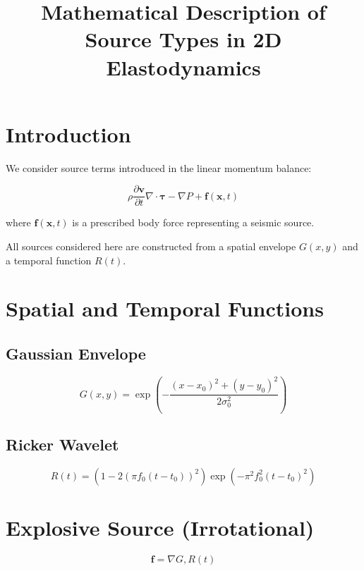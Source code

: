 \documentclass[11pt]{article}
\title{Mathematical Description of Source Types in 2D Elastodynamics}
\author{}
\date{}
\begin{document}
\maketitle

\section{Introduction}

We consider source terms introduced in the linear momentum balance:

\begin{equation}
\rho \frac{\partial \bm{v}}{\partial t}
\nabla \cdot \bm{\tau} - \nabla P + \bm{f}(\bm{x},t)
\end{equation}

where $\bm{f}(\bm{x},t)$ is a prescribed body force representing a seismic source.

All sources considered here are constructed from a spatial envelope $G(x,y)$ and a temporal function $R(t)$.

\section{Spatial and Temporal Functions}

\subsection{Gaussian Envelope}

\begin{equation}
G(x,y) = \exp\left(-\frac{(x-x_0)^2 + (y-y_0)^2}{2\sigma_0^2}\right)
\end{equation}

\subsection{Ricker Wavelet}

\begin{equation}
R(t) = \left(1 - 2(\pi f_0 (t-t_0))^2 \right)
\exp\left(-\pi^2 f_0^2 (t-t_0)^2 \right)
\end{equation}

\section{Explosive Source (Irrotational)}

\begin{equation}
\bm{f} = \nabla G , R(t)
\end{equation}
\end{document}
